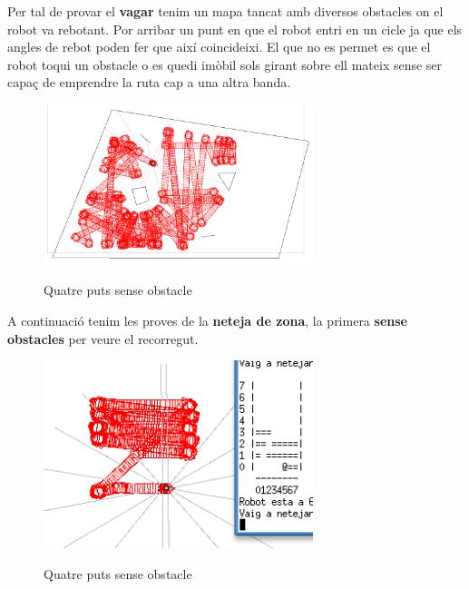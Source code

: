 Per tal de provar el \textbf{vagar} tenim un mapa tancat amb diversos obstacles on el robot va rebotant.
Por arribar un punt en que el robot entri en un cicle ja que els angles de rebot poden fer que així
coincideixi. El que no es permet es que el robot toqui un obstacle o es quedi imòbil sols girant sobre
ell mateix sense ser capaç de emprendre la ruta cap a una altra banda.

\begin{figure}[H]
\begin{center}\label{vagant}
 \includegraphics[width=0.7\textwidth]{diagrames/figures/vagant.png}
\end{center}
  \caption{Quatre puts sense obstacle}
\end{figure}

A continuació tenim les proves de la \textbf{neteja de zona}, la primera \textbf{sense obstacles} per veure el recorregut.

\begin{figure}[H]
\begin{center}\label{neteja}
 \includegraphics[width=0.7\textwidth]{diagrames/figures/netNoObs.png}
\end{center}
  \caption{Quatre puts sense obstacle}
\end{figure}


